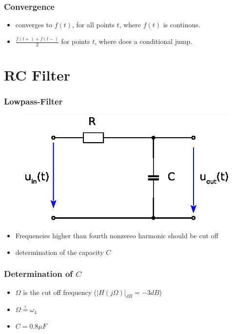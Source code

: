 \documentclass{beamer}
\begin{document}
\begin{frame}
\frametitle{Convergence}
\begin{itemize}
  \item converges to $f(t)$, for all points $t$, where $f(t)$ is continous.
  \item $\frac{f(t+) + f(t-)}{2}$ for points $t$, where does a conditional jump.
    
\end{itemize}
\end{frame}

\section{RC Filter}

\begin{frame}
  \frametitle{Lowpass-Filter}
  \begin{figure}
    \includegraphics[scale=0.6]{../latex/Figures/filter.eps}
  \end{figure}
  \begin{itemize}
    \item Frequencies higher than fourth nonzereo harmonic should be cut off
    \item determination of the capacity $C$
  \end{itemize}
\end{frame}
\begin{frame}
  \frametitle{Determination of $C$}
  \begin{itemize}
    \item $\Omega$ is the cut off frequency ($|H(j\Omega)|_{dB} = -3dB$)
    \item $\Omega \overset{!}{=} \omega_4$
    \item $C = 0.8\mu F$
  \end{itemize}
\end{frame}
\end{document}
